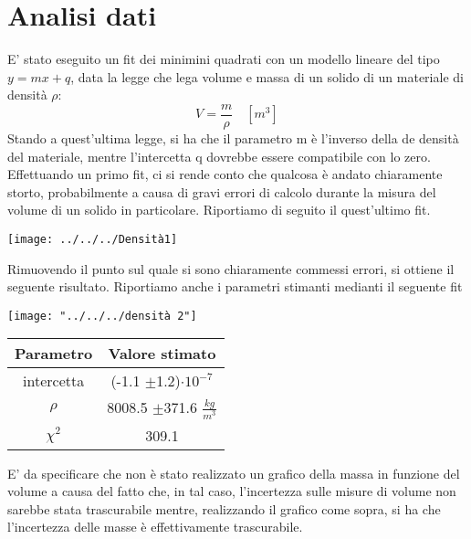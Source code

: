 \documentclass{article}
\begin{document}
    \section{Analisi dati}
	E' stato eseguito un fit dei minimini quadrati con un modello lineare del tipo $y=mx+q$, data la legge che lega volume e massa di un solido di un materiale di densità $\rho$:
	\vspace{1em}
	\begin{equation}
		V=\frac{m}{\rho} \quad [m^{3}]
	\end{equation}
	\vspace{1em}
	Stando a quest'ultima legge, si ha che il parametro m è l'inverso della de densità del materiale, mentre l'intercetta q dovrebbe essere compatibile con lo zero.
	Effettuando un primo fit, ci si rende conto che qualcosa è andato chiaramente storto, probabilmente a causa di gravi errori di calcolo durante la misura del volume di un solido in particolare. Riportiamo di seguito il quest'ultimo fit.
	
\begin{center}
	\texttt{[image: ../../../Densità1]}
\end{center}
	\vspace{1em}
	Rimuovendo il punto sul quale si sono chiaramente commessi errori, si ottiene il seguente risultato. Riportiamo anche i parametri stimanti medianti il seguente fit
	
\begin{center}
	\texttt{[image: "../../../densità 2"]}
\end{center}
	\begin{center}
		\begin{tabular}{cc}
			\hline
		Parametro	& Valore stimato  \\
			\hline
		intercetta	& (-1.1 $\pm$1.2)$\cdot10^{-7}$\\
		$\rho$	&8008.5 $\pm$371.6 $\frac{kg}{m^{3}}$ \\
		$\chi^{2}$	& 309.1 \\
			\hline
		\end{tabular}
	\end{center}
	\vspace{1em}

	\vspace{1em}
	E' da specificare che non è stato realizzato un grafico della massa in funzione del volume a causa del fatto che, in tal caso, l'incertezza sulle misure di volume non sarebbe stata trascurabile mentre, realizzando il grafico come sopra, si ha che l'incertezza delle masse è effettivamente trascurabile.
	
\end{document}
